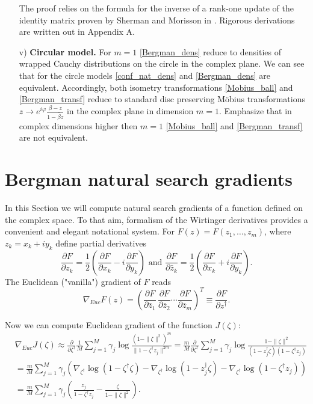 \documentclass{article}
\theoremstyle{plain}%
\theoremstyle{definition}
\theoremstyle{remark}
\theoremstyle{prop}
\begin{document}
\begin{enumerate}
The proof relies on the formula for the inverse of a rank-one update of the identity matrix proven by Sherman and Morisson in \cite{SM}. Rigorous derivations are written out in Appendix A.


\item[v)] {\bf Circular model.}
For $m=1$ \eqref{Bergman_dens} reduce to densities of wrapped Cauchy distributions on the circle in the complex plane. We can see that for the circle models \eqref{conf_nat_dens} and \eqref{Bergman_dens} are equivalent. Accordingly, both isometry transformations \eqref{Mobius_ball} and \eqref{Bergman_transf} reduce to standard disc preserving M\" obius transformations $z \to e^{i \varphi} \frac{\beta - z}{1 - \bar \beta z}$ in the complex plane in dimension $m = 1$. Emphasize that in complex dimensions higher then $m=1$ \eqref{Mobius_ball} and \eqref{Bergman_transf} are not equivalent. 

\end{enumerate}


\section{Bergman natural search gradients}

In this Section we will compute natural search gradients of a function defined on the complex space. To that aim, formalism of the Wirtinger derivatives provides a convenient and elegant notational system\cite{Hormander}. For $F(z) = F(z_1,\dots,z_m)$, where $z_k = x_k + i y_k$ define partial derivatives
$$
\frac{\partial F}{\partial z_k} = \frac{1}{2} \left( \frac{\partial F}{\partial x_k} - i \frac{\partial F}{\partial y_k} \right) \mbox{    and    } \frac{\partial F}{\partial \bar z_k} = \frac{1}{2} \left( \frac{\partial F}{\partial x_k} + i \frac{\partial F}{\partial y_k} \right).
$$
The Euclidean ("vanilla") gradient of $F$ reads
$$
\nabla_{Euc} F(z) = \left( \frac{\partial F}{\partial \bar z_1} \, \frac{\partial F}{\partial \bar z_2} \cdots \frac{\partial F}{\partial \bar z_m} \right)^T \equiv \frac{\partial F}{\partial z^\dagger}.
$$  

Now we can compute Euclidean gradient of the function $J(\zeta)$:
\begin{equation}
\label{Bergman_scores}
\begin{split}
& \nabla_{Euc} J(\zeta) \approx \frac{\partial}{\partial \zeta^\dagger} \frac{1}{M} \sum_{j=1}^M \gamma_j \log \frac{(1-\| \zeta \|^2)^m}{\|1 - \zeta^\dagger z_j \|^{2m}} = \frac{m}{M} \frac{\partial}{\partial \zeta^\dagger} \sum_{j=1}^M \gamma_j \log \frac{1 - \| \zeta \|^2}{(1 - z_j^\dagger \zeta)(1 - \zeta^\dagger z_j)} \\ 
& =  \frac{m}{M} \sum_{j=1}^M \gamma_j (\nabla_{\zeta^\dagger} \log(1 - \zeta^\dagger \zeta) -  \nabla_{\zeta^\dagger} \log (1 - z_j^\dagger \zeta) - \nabla_{\zeta^\dagger} \log (1 - \zeta^\dagger z_j)) \\
& = \frac{m}{M} \sum_{j=1}^M \gamma_j \left( \frac{z_j}{1 - \zeta^\dagger z_j} - \frac{\zeta}{1 - \| \zeta\|^2} \right).
\end{split}
\end{equation}
\end{document}

